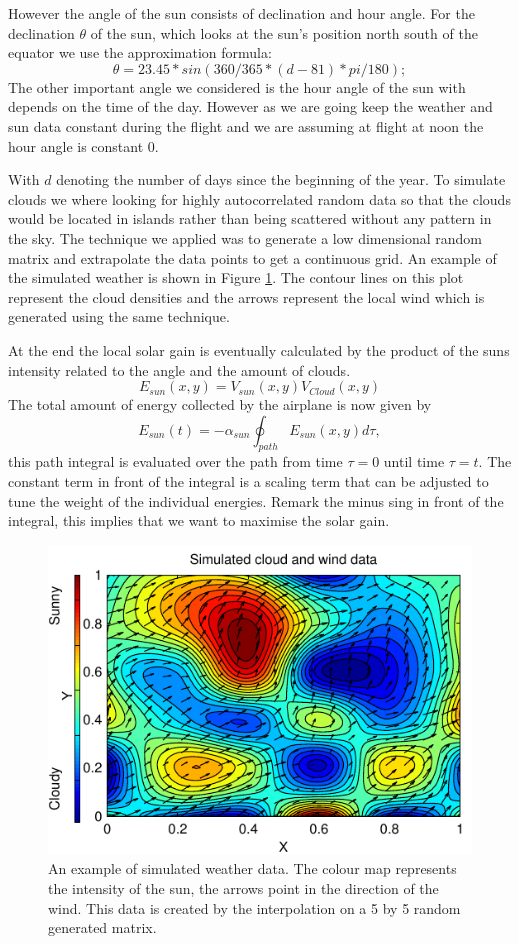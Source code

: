 However the angle of the sun consists of declination and hour angle. For the declination $\theta$ of the sun, which looks at the sun's position north south of the equator  we use the approximation formula:
\begin{equation}
\theta = 23.45 * sin(360/365 * (d -81)*pi/180);
\end{equation}
The other important angle we considered is the hour angle of the sun with depends on the time of the day. However as we are going keep the weather and sun data constant during the flight and we are assuming at flight at noon the hour angle is constant 0.

With $d$ denoting the number of days since the beginning of the year.
To simulate clouds we where looking for highly autocorrelated random data so that the clouds would be located in islands rather than being scattered without any pattern in the sky.
The technique we applied was to generate a low dimensional random matrix and extrapolate the data points to get a continuous grid.
An example of the simulated weather is shown in Figure \ref{fig:RandomWeather}.
The contour lines on this plot represent the cloud densities and the arrows represent the local wind which is generated using the same technique.

At the end the local solar gain is eventually calculated by the product of the suns intensity related to the angle and the amount of clouds.
\begin{equation}
E_{sun}(x,y)  =  V_{sun}(x,y) V_{Cloud}(x,y)
\end{equation}
The total amount of energy collected by the airplane is now given by 
\begin{equation}
E_{sun}(t)  =  -\alpha_{sun}\oint_{path} E_{sun}(x,y)  d\tau,
\end{equation}
this path integral is evaluated over the path from time $ \tau=0 $ until time $ \tau=t $.
The constant term in front of the integral is a scaling term that can be adjusted to tune the weight of the individual energies.
Remark the minus sing in front of the integral, this implies that we want to maximise the solar gain.

\begin{figure}
\centering
\includegraphics[width=0.5\linewidth]{../src/plot/RandomWeather}
\caption{An example of  simulated weather data. The colour map represents the intensity of the sun, the arrows point in the direction of the wind. This data is created by the  interpolation on a 5 by 5 random generated matrix. }
\label{fig:RandomWeather}
\end{figure}


